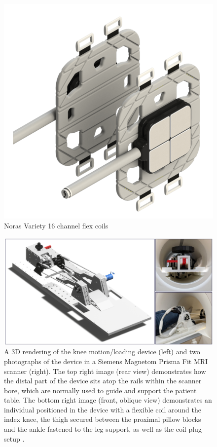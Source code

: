 \documentclass{micro-econ-thesis}
\begin{document}
\begin{figure}[H]
	\centering
	\includegraphics[scale=0.2]{coils}
	\caption{Noras Variety 16 channel flex coils}
	\label{fig:coils}
\end{figure}


\begin{figure}[H]
	\centering
	\includegraphics[width=0.9\linewidth]{knee_device}
	\caption{A 3D rendering of the knee motion/loading device (left) and two photographs of the device in a Siemens Magnetom Prisma Fit MRI scanner (right). The top right image (rear view) demonstrates how the distal part of the device sits atop the rails within the scanner bore, which are normally used to guide and support the patient table. The bottom right image (front, oblique view) demonstrates an individual positioned in the device with a flexible coil around the index knee, the thigh secured between the proximal pillow blocks and the ankle fastened to the leg support, as well as the coil plug setup \parencite{brisson_novel_2022}. }
	\label{fig:kneedevice}
\end{figure}
 
\end{document}
